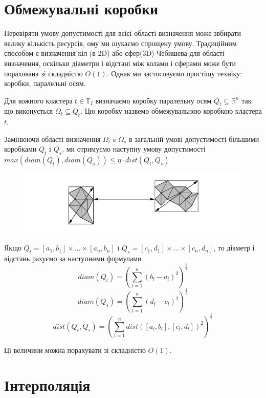 \documentclass[12pt]{report}
\begin{document}
	\section{Обмежувальні коробки}
	\hspace{0.8cm} Перевіряти умову допустимості для всієї області визначення може звбирати велику кількість ресурсів, ому ми шукаємо спрощену умову. Традиційним способом є визначення кіл  (в 2D) або сфер(3D) Чебишева для області визначення, оскільки діаметри і відстані між колами і сферами може бути порахована зі складністю $O(1)$. Однак ми застосовуємо простішу техніку: коробки, паралельні осям.
	\par Для кожного кластера $t\in \mathbb{T}_I$ визначаємо коробку паралельну осям $Q_t\subseteq\mathbb{R}^n$ так що виконується $\Omega_t\subseteq Q_t$. Цю коробку назвемо обмежувальною коробкою кластера $t$. 
	\par Замінюючи області визначення $\Omega_t$ s $\Omega_s$ в загальній умові допустимості більшими коробками $Q_t$ і $Q_s$, ми отримуємо наступну умову допустимості
	$max(diam(Q_{t}),diam(Q_{s}))\le \eta\cdot dist(Q_{t},Q_{s})$ 
	\begin{figure}[bh]{
			\includegraphics{2_0}
		}
	\end{figure}	
	\par Якщо $Q_t=[a_1,b_1]\times...\times[a_n,b_n]$ i $Q_s=[c_1,d_1]\times...\times[c_n,d_n]$, то діаметр і відстань рахуємо за наступними формулами
	$$diam(Q_t)=\left(\sum_{l=1}^{n}(b_l-a_l)^2\right)^\frac{1}{2}$$
	$$diam(Q_s)=\left(\sum_{l=1}^{n}(d_l-c_l)^2\right)^\frac{1}{2}$$
	$$dist(Q_t,Q_s)=\left(\sum_{l=1}^{n}dist([a_l,b_l],[c_l,d_l])^2\right)^\frac{1}{2}$$
	\par Ці величини можна порахувати зі складністю $O(1)$.
	\section{Інтерполяція}
\end{document}
